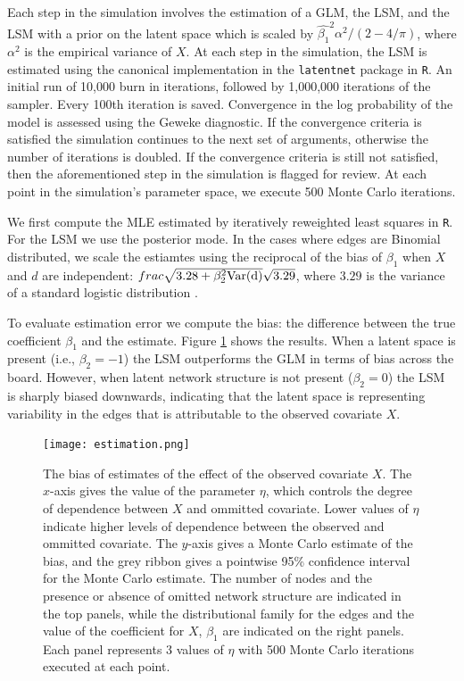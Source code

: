 \documentclass[12pt]{article}
\begin{document}
Each step in the simulation involves the estimation of a GLM, the LSM, and the LSM with a prior on the latent space which is scaled by $\hat{\beta_1}^2\alpha^2/(2-4/\pi)$, where $\alpha^2$ is the empirical variance of $X$. At each step in the simulation, the LSM is estimated using the canonical implementation in the \texttt{latentnet} package in \texttt{R}. An initial run of 10,000 burn in iterations, followed by 1,000,000 iterations of the sampler. Every 100th iteration is saved. Convergence in the log probability of the model is assessed using the Geweke diagnostic. If the convergence criteria is satisfied the simulation continues to the next set of arguments, otherwise the number of iterations is doubled. If the convergence criteria is still not satisfied, then the aforementioned step in the simulation is flagged for review. At each point in the simulation's parameter space, we execute 500 Monte Carlo iterations.

We first compute the MLE estimated by iteratively reweighted least squares in \texttt{R}. For the LSM we use the posterior mode. In the cases where edges are Binomial distributed, we scale the estiamtes using the reciprocal of the bias of $\beta_1$ when $X$ and $d$ are independent: $\\frac{\sqrt{3.28 + \beta_2^2 \text{Var(d)}}}{\sqrt{3.29}}$, where $3.29$ is the variance of a standard logistic distribution \cite{mood2010logistic}.

To evaluate estimation error we compute the bias: the difference between the true coefficient $\beta_1$ and the estimate. Figure \ref{fig:estimation} shows the results. When a latent space is present (i.e., $\beta_2 = -1$) the LSM outperforms the GLM in terms of bias across the board. However, when latent network structure is not present ($\beta_2 = 0$) the LSM is sharply biased downwards, indicating that the latent space is representing variability in the edges that is attributable to the observed covariate $X$.

\begin{figure}
\texttt{[image: estimation.png]}
\caption{The bias of estimates of the effect of the observed covariate $X$. The $x$-axis gives the value of the parameter $\eta$, which controls the degree of dependence between $X$ and ommitted covariate. Lower values of $\eta$ indicate higher levels of dependence between the observed and ommitted covariate. The $y$-axis gives a Monte Carlo estimate of the bias, and the grey ribbon gives a pointwise 95\% confidence interval for the Monte Carlo estimate. The number of nodes and the presence or absence of omitted network structure are indicated in the top panels, while the distributional family for the edges and the value of the coefficient for $X$, $\beta_1$ are indicated on the right panels. Each panel represents 3 values of $\eta$ with 500 Monte Carlo iterations executed at each point.
\label{fig:estimation}}
\end{figure}
\end{document}
